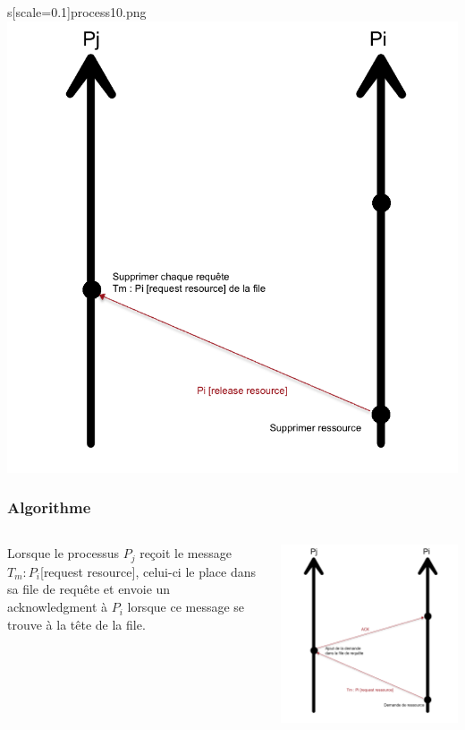 \documentclass[compress]{beamer}
\begin{document}
\begin{frame}
s[scale=0.1]{process10.png}\includegraphics[scale=0.1]{process11.png}
\end{frame}

\begin{frame}
\frametitle{Algorithme}
	\begin{columns}
    	\begin{column}{.65\textwidth}
			Lorsque le processus $P_j$ reçoit le message $T_m : P_i$[request resource], celui-ci le place dans sa file de requête et envoie un acknowledgment à $P_i$ lorsque ce message se trouve à la tête de la file.
		\end{column}
		\begin{column}{.35\textwidth}
			\includegraphics[scale=0.13]{process9.png}
		\end{column}
	\end{columns}
	

\end{frame}
\end{document}
